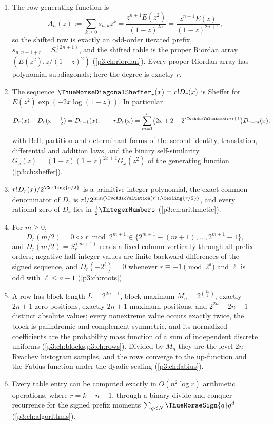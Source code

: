 \documentclass[11pt,oneside]{article}
\numberwithin{equation}{section}
\theoremstyle{definition}
\theoremstyle{remark}
\begin{document}
\begin{enumerate}
\item The row generating function is
\[
 A_n(z):=\sum_{k\ge0}s_{n,k}z^k
 =\frac{z^{n+1}E(z^2)}{(1-z)^{2n}}
 =\frac{z^{n+1}E(z)}{(1-z)^{2n+1}},
\]
so the shifted row is exactly an odd-order iterated prefix,
$s_{n,n+1+r}=S_r^{(2n+1)}$, and the shifted table is the proper Riordan
array $(E(z^2),z/(1-z)^2)$ (\cref{p3:ch:riordan}). Every proper Riordan array
has polynomial subdiagonals; here the degree is exactly $r$.

\item The sequence $\ThueMorseDiagonalSheffer_r(x)=r!D_r(x)$ is Sheffer for
$E(z^2)\exp(-2x\log(1-z))$. In particular
\[
 D_r(x)-D_r(x-\tfrac12)=D_{r-1}(x),
 \qquad
 r D_r(x)=\sum_{m=1}^r\bigl(2x+2-2^{\TwoAdicValuation(m)+1}\bigr)D_{r-m}(x),
\]
with Bell, partition and determinant forms of the second identity,
translation, differential and addition laws, and the binary self-similarity
$G_x(z)=(1-z)(1+z)^{2x+1}G_x(z^2)$ of the generating function
(\cref{p3:ch:sheffer}).

\item $r!D_r(x)/2^{\Ceiling{r/2}}$ is a primitive integer polynomial,
the exact common denominator of $D_r$ is
$r!/2^{\min(\TwoAdicValuation(r!),\Ceiling{r/2})}$, and every rational zero of
$D_r$ lies in $\tfrac12\IntegerNumbers$ (\cref{p3:ch:arithmetic}).

\item For $m\ge0$,
\[
 D_r(m/2)=0
 \iff
 r\bmod 2^{m+1}\in\{2^{m+1}-(m+1),\ldots,2^{m+1}-1\},
\]
and $D_r(m/2)=S_r^{(m+1)}$ reads a fixed column vertically through
all prefix orders; negative half-integer values are finite backward
differences of the signed sequence, and $D_r(-2^\ell)=0$ whenever
$r\equiv-1\pmod{2^a}$ and $\ell$ is odd with $\ell\le a-1$
(\cref{p3:ch:roots}).

\item A row has block length $L=2^{2n+1}$, block maximum
$M_n=2^{\binom{2n}{2}}$, exactly $2n+1$ zero positions, exactly $2n+1$
maximum positions, and $2^{2n}-2n+1$ distinct absolute values; every
nonextreme value occurs exactly twice, the block is palindromic and
complement-symmetric, and its normalized coefficients are the probability
mass function of a sum of independent discrete uniforms
(\cref{p3:ch:blocks,p3:ch:rows}). Divided by $M_n$ they are the level-$2n$ Rvachev
histogram samples, and the rows converge to the up-function and the Fabius
function under the dyadic scaling (\cref{p3:ch:fabius}).

\item Every table entry can be computed exactly in $O(n^2\log r)$ arithmetic
operations, where $r=k-n-1$, through a binary divide-and-conquer recurrence
for the signed prefix moments $\sum_{q<N}\ThueMorseSign{q}q^d$ (\cref{p3:ch:algorithms}).
\end{enumerate}
\end{document}
